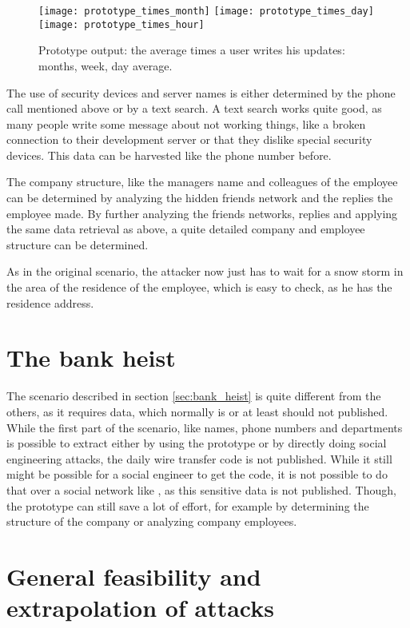 \begin{figure}[htb]
  \begin{center}
    \texttt{[image: prototype\_times\_month]} 
    \texttt{[image: prototype\_times\_day]} 
    \texttt{[image: prototype\_times\_hour]}
    \caption{Prototype output: the average times a user writes his updates: months,
    week, day average.}
    \label{fig:prototype_times}
  \end{center}
\end{figure}

The use of security devices and server names is either determined by the phone
call mentioned above or by a text search. A text search works quite good, as
many people write some message about not working things, like a broken
connection to their development server or that they dislike special security
devices. This data can be harvested like the phone number before.

The company structure, like the managers name and colleagues of the employee
can be determined by analyzing the hidden friends network and the replies the
employee made. By further analyzing the friends networks, replies and applying
the same data retrieval as above, a quite detailed company and employee
structure can be determined.

As in the original scenario, the attacker now just has to wait for a snow storm
in the area of the residence of the employee, which is easy to check, as he
has the residence address.

\section{The bank heist}

The scenario described in section \ref{sec:bank_heist} is quite different from
the others, as it requires data, which normally is or at least should not
published. While the first part of the scenario, like names, phone numbers and
departments is possible to extract either by using the prototype or by directly
doing social engineering attacks, the daily wire transfer code is not
published. While it still might be possible for a social engineer to get the
code, it is not possible to do that over a social network like \Twitter{}, as
this sensitive data is not published. Though, the prototype can still save a
lot of effort, for example by determining the structure of the company or
analyzing company employees.


\section{General feasibility and extrapolation of attacks}

